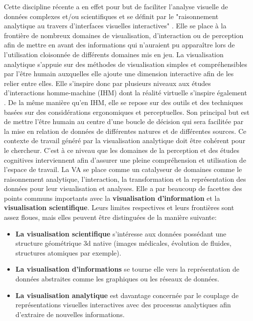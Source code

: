 Cette discipline récente a en effet pour but de faciliter l'analyse visuelle de données complexes et/ou scientifiques et se définit par le "raisonnement analytique au travers d'interfaces visuelles interactives" \cite{cook_illuminating_2005}. Elle se place à la frontière de nombreux domaines de visualisation, d'interaction ou de perception afin de mettre en avant des informations qui n'auraient pu apparaître lors de l'utilisation cloisonnée de différents domaines mis en jeu. La visualisation analytique s'appuie sur des méthodes de visualisation simples et compréhensibles par l'être humain auxquelles elle ajoute une dimension interactive afin de les relier entre elles. Elle s'inspire donc par plusieurs niveaux aux études d'interactions homme-machine (IHM) dont la réalité virtuelle s'inspire également \cite{arias-hernandez_visual_2011}. De la même manière qu'en IHM, elle se repose sur des outils et des techniques basées sur des considérations ergonomiques et perceptuelles. Son principal but est de mettre l'être humain au centre d'une boucle de décision qui sera facilitée par la mise en relation de données de différentes natures et de différentes sources. Ce contexte de travail généré par la visualisation analytique doit être cohérent pour le chercheur. C'est à ce niveau que les domaines de la perception et des études cognitives interviennent afin d'assurer une pleine compréhension et utilisation de l'espace de travail. La VA se place comme un catalyseur de domaines comme le raisonnement analytique, l'interaction, la transformation et la représentation des données pour leur visualisation et analyses.
Elle a par beaucoup de facettes des points communs importants avec la \textbf{visualisation d'information} et la \textbf{visualisation scientifique}. Leurs limites respectives et leurs frontières sont assez floues, mais elles peuvent être distinguées de la manière suivante:

\begin{itemize}
  \item \textbf{La visualisation scientifique} s'intéresse aux données possédant une structure géométrique 3d native (images médicales, évolution de fluides, structures atomiques par exemple).
  \item \textbf{La visualisation d'informations} se tourne elle vers la représentation de données abstraites comme les graphiques ou les réseaux de données.
  \item \textbf{La visualisation analytique} est davantage concernée par le couplage de représentations visuelles interactives avec des processus analytiques afin d'extraire de nouvelles informations.
\end{itemize}

